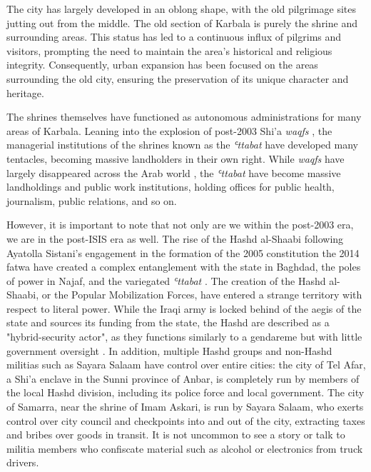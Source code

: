 The city has largely developed in an oblong shape, with the old pilgrimage sites jutting out from the middle. The old section of Karbala is purely the shrine and surrounding areas. This status has led to a continuous influx of pilgrims and visitors, prompting the need to maintain the area's historical and religious integrity. Consequently, urban expansion has been focused on the areas surrounding the old city, ensuring the preservation of its unique character and heritage.

The shrines themselves have functioned as autonomous administrations for many areas of Karbala. Leaning into the explosion of post-2003 Shi'a \emph{waqfs} \cite{hamdan_development_2012}, the managerial institutions of the shrines known as the \emph{ʿttabat}  have developed many tentacles, becoming massive landholders in their own right. While \emph{waqfs} have largely disappeared across the Arab world \cite{moumtaz_gods_2021}, the \emph{ʿttabat}  have become massive landholdings and public work institutions, holding offices for public health, journalism, public relations, and so on. 

However, it is important to note that not only are we within the post-2003 era, we are in the post-ISIS era as well. The rise of the Hashd al-Shaabi following Ayatolla Sistani's engagement in the formation of the 2005 constitution \cite{al-rahim_sistani_2005} the 2014 fatwa \cite{rudolf_battlefield_nodate}\cite{ann_wainscott_engaging_2019} have created a complex entanglement with the state in Baghdad, the poles of power in Najaf, and the variegated \emph{ʿttabat} . The creation of the Hashd al-Shaabi, or the Popular Mobilization Forces, have entered a strange territory with respect to literal power. While the Iraqi army is locked behind of the aegis of the state and sources its funding from the state, the Hashd are described as a "hybrid-security actor", as they functions similarly to a gendareme but with little government oversight \cite{cambanis_hybrid_2019} \cite{renad_mansour_popular_2018}. In addition, multiple Hashd groups and non-Hashd militias such as Sayara Salaam have control over entire cities: the city of Tel Afar, a Shi'a enclave in the Sunni province of Anbar, is completely run by members of the local Hashd division, including its police force and local government. The city of Samarra, near the shrine of Imam Askari, is run by Sayara Salaam, who exerts control over city council and checkpoints into and out of the city, extracting taxes and bribes over goods in transit. It is not uncommon to see a story or talk to militia members who confiscate material such as alcohol or electronics from truck drivers. 

